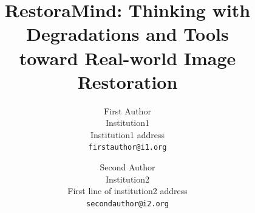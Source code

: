\documentclass[10pt,twocolumn,letterpaper]{article}
\title{RestoraMind: Thinking with Degradations and Tools \\ toward Real-world Image Restoration}
\author{First Author\\
Institution1\\
Institution1 address\\
{\tt\small firstauthor@i1.org}
\and
Second Author\\
Institution2\\
First line of institution2 address\\
{\tt\small secondauthor@i2.org}
}
\begin{document}
\maketitle
    





% 
{
    \small
    
    
}

% 
\end{document}
